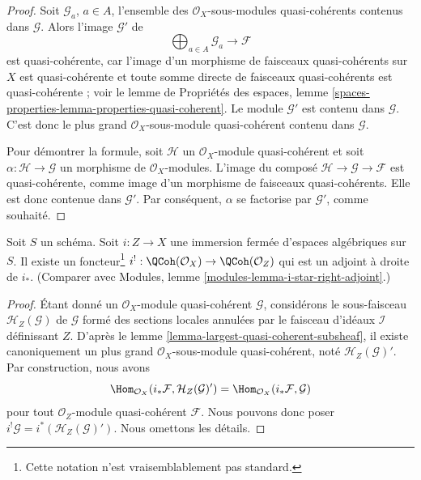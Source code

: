 \begin{proof}
Soit $\mathcal{G}_a$, $a \in A$, l'ensemble des
$\mathcal{O}_X$-sous-modules quasi-cohérents contenus dans $\mathcal{G}$.
Alors l'image $\mathcal{G}'$ de
$$
\bigoplus\nolimits_{a \in A} \mathcal{G}_a \longrightarrow \mathcal{F}
$$
est quasi-cohérente, car l'image d'un morphisme de faisceaux quasi-cohérents
sur $X$ est quasi-cohérente et toute somme directe de faisceaux quasi-cohérents
est quasi-cohérente ; voir le lemme de
Propriétés des espaces,
lemme \ref{spaces-properties-lemma-properties-quasi-coherent}.
Le module $\mathcal{G}'$ est contenu dans $\mathcal{G}$. C'est donc le
plus grand $\mathcal{O}_X$-sous-module quasi-cohérent contenu dans $\mathcal{G}$.

\medskip\noindent
Pour démontrer la formule, soit $\mathcal{H}$ un
$\mathcal{O}_X$-module quasi-cohérent et soit $\alpha : \mathcal{H} \to \mathcal{G}$
un morphisme de $\mathcal{O}_X$-modules. L'image du composé
$\mathcal{H} \to \mathcal{G} \to \mathcal{F}$ est quasi-cohérente,
comme image d'un morphisme de faisceaux quasi-cohérents. Elle est donc contenue
dans $\mathcal{G}'$. Par conséquent, $\alpha$ se factorise par $\mathcal{G}'$,
comme souhaité.
\end{proof}

\begin{lemma}
\label{lemma-i-upper-shriek}
Soit $S$ un schéma.
Soit $i : Z \to X$ une immersion fermée d'espaces algébriques sur $S$.
Il existe un foncteur\footnote{Cette notation n'est vraisemblablement pas standard.}
$i^! : \QCoh(\mathcal{O}_X) \to \QCoh(\mathcal{O}_Z)$
qui est un adjoint à droite de $i_*$. (Comparer avec
Modules, lemme \ref{modules-lemma-i-star-right-adjoint}.)
\end{lemma}

\begin{proof}
Étant donné un $\mathcal{O}_X$-module quasi-cohérent $\mathcal{G}$, considérons
le sous-faisceau $\mathcal{H}_Z(\mathcal{G})$ de $\mathcal{G}$ formé des sections locales
annulées par le faisceau d'idéaux $\mathcal{I}$ définissant $Z$. D'après le
lemme \ref{lemma-largest-quasi-coherent-subsheaf},
il existe canoniquement un plus grand $\mathcal{O}_X$-sous-module quasi-cohérent,
noté $\mathcal{H}_Z(\mathcal{G})'$. Par construction, nous avons
$$
\Hom_{\mathcal{O}_X}(i_*\mathcal{F}, \mathcal{H}_Z(\mathcal{G})')
=
\Hom_{\mathcal{O}_X}(i_*\mathcal{F}, \mathcal{G})
$$
pour tout $\mathcal{O}_Z$-module quasi-cohérent $\mathcal{F}$.
Nous pouvons donc poser $i^!\mathcal{G} = i^*(\mathcal{H}_Z(\mathcal{G})')$.
Nous omettons les détails.
\end{proof}

